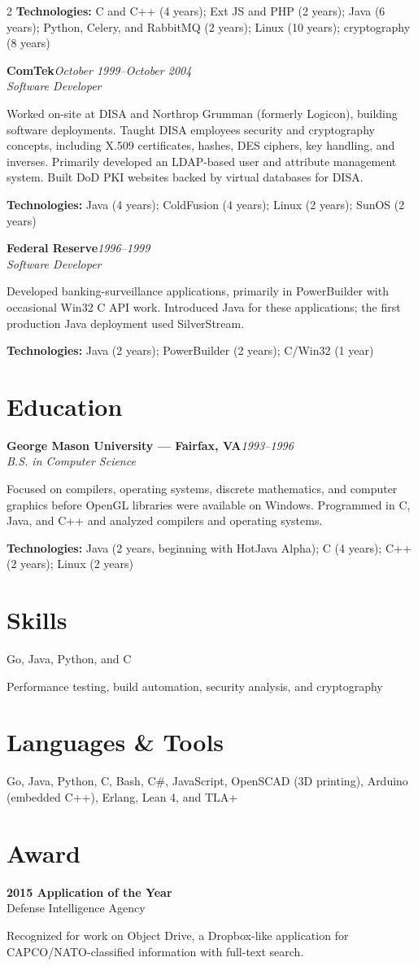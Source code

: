 \documentclass[10pt,letterpaper]{article}
\newcommand{\role}[3]{%
  \textbf{#1}\hfill\textit{#2}\\[-1pt]
  \textit{#3}\par
}
\newcommand{\tech}[1]{\small\textbf{Technologies:} #1\normalsize}
\begin{document}
\begin{paracol}{2}
\tech{C and C++ (4 years); Ext JS and PHP (2 years); Java (6 years); Python, Celery, and RabbitMQ (2 years); Linux (10 years); cryptography (8 years)}

\role{ComTek}{October 1999--October 2004}{Software Developer}
Worked on-site at DISA and Northrop Grumman (formerly Logicon), building software deployments. Taught DISA employees security and cryptography concepts, including X.509 certificates, hashes, DES ciphers, key handling, and inverses. Primarily developed an LDAP-based user and attribute management system. Built DoD PKI websites backed by virtual databases for DISA.

\tech{Java (4 years); ColdFusion (4 years); Linux (2 years); SunOS (2 years)}

\role{Federal Reserve}{1996--1999}{Software Developer}
Developed banking-surveillance applications, primarily in PowerBuilder with occasional Win32 C API work. Introduced Java for these applications; the first production Java deployment used SilverStream.

\tech{Java (2 years); PowerBuilder (2 years); C/Win32 (1 year)}

\section*{Education}

\role{George Mason University --- Fairfax, VA}{1993--1996}{B.S. in Computer Science}
Focused on compilers, operating systems, discrete mathematics, and computer graphics before OpenGL libraries were available on Windows. Programmed in C, Java, and C++ and analyzed compilers and operating systems.

\tech{Java (2 years, beginning with HotJava Alpha); C (4 years); C++ (2 years); Linux (2 years)}

\switchcolumn

\section*{Skills}
Go, Java, Python, and C

Performance testing, build automation, security analysis, and cryptography

\section*{Languages \& Tools}
Go, Java, Python, C, Bash, C\#, JavaScript, OpenSCAD (3D printing), Arduino (embedded C++), Erlang, Lean 4, and TLA+

\section*{Award}
\textbf{2015 Application of the Year}\\
Defense Intelligence Agency

Recognized for work on Object Drive, a Dropbox-like application for CAPCO/NATO-classified information with full-text search.

\end{paracol}
\end{document}
